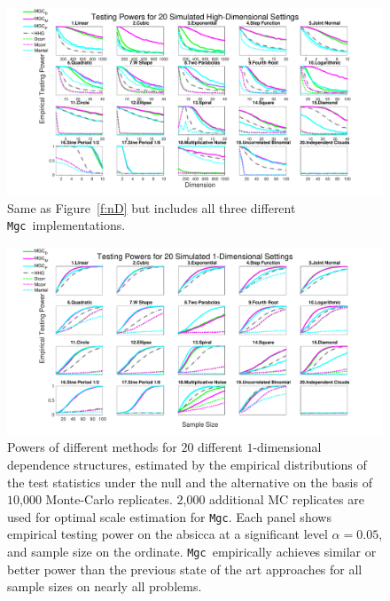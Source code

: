 \documentclass[11pt]{article}
\providecommand{\sct}[1]{{\sc \texttt{#1}}}
\newcommand{\Mgc}{\sct{Mgc}}
\begin{document}
\begin{figure}[htbp]
\includegraphics[width=1.0\textwidth]{../Figures/FigHDPowerAll}
\caption{
Same as Figure~\ref{f:nD} but includes all three different \Mgc~implementations.}
\label{f:nDAll}
\end{figure}

\begin{figure}[htbp]
\includegraphics[width=1.0\textwidth]{../Figures/Fig1DPowerAll}
\caption{
Powers of different methods for $20$ different $1$-dimensional dependence structures, estimated by the empirical distributions of the test statistics under the null and the alternative on the basis of $10$,$000$ Monte-Carlo replicates. $2$,$000$ additional MC replicates are used for optimal scale estimation for \Mgc.
Each panel shows empirical testing power on the absicca at a significant level $\alpha=0.05$, and sample size on the ordinate.
\Mgc~empirically achieves similar or better power than the previous state of the art approaches for all sample sizes on nearly all problems.}
\label{f:1DAll}
\end{figure}
\end{document}
